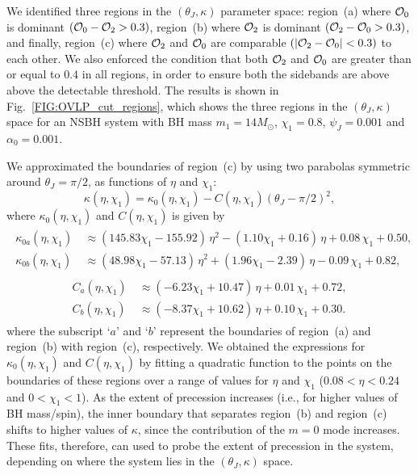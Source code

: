 We identified three regions in the $(\theta_J, \kappa)$ parameter space:
region~(a) where ${\cal{O}}_0$ is dominant $({\cal{O}}_0 - {\cal{O}}_2 >
0.3)$, region~(b) where ${\cal{O}}_2$ is dominant $({\cal{O}}_2 - {\cal{O}}_0
> 0.3)$, and finally, region~(c) where ${\cal O}_2$ and ${\cal O}_0$ are
comparable $(|{\cal{O}}_2-{\cal{O}}_0|< 0.3)$ to each other. We also enforced
the condition that both ${\cal O}_2$ and ${\cal O}_0$ are greater than or
equal to $0.4$ in all regions, in order to ensure both the sidebands are above
above the detectable threshold. The results is shown in
Fig.~\ref{FIG:OVLP_cut_regions}, which shows the three regions in the
$(\theta_J,\kappa)$ space for an NSBH system with BH mass $m_{1}=14 M_\odot$,
$\chi_1=0.8$, $\psi_J=0.001$ and $\alpha_0 =0.001$.


We approximated the boundaries of region~(c) by using two parabolas symmetric
around $\theta_J=\pi/2$, as functions of $\eta$ and $\chi_1$:
\begin{equation}
\kappa(\eta, \chi_1) = \kappa_{0}(\eta, \chi_1) - C(\eta, \chi_1)(\theta_J-\pi/2)^2, 
\label{EQ:boundary_region}
\end{equation}
where $\kappa_{0}(\eta, \chi_1)$ and $C(\eta, \chi_1)$ is given by
\begin{align}
\begin{split}
\kappa_{0a}(\eta, \chi_{1})~&\approx  (145.83 \chi_{1} - 155.92)\, \eta^2 -
(1.10 \chi_{1} + 0.16)\, \eta+ 0.08 \, \chi_{1}+0.50,\\
\kappa_{0b}(\eta, \chi_{1})~&\approx (48.98\chi_{1} - 57.13) \,\eta^2 +
(1.96{\chi_{1}}-2.39)\, \eta - 0.09 \, \chi_{1} +0.82,
\label{EQ:kappa_boundary}
\end{split}
\end{align}
\vspace{-10mm}
\begin{align}
\begin{split}
C_{a}(\eta, \chi_{1})~&\approx  (-6.23{\chi_{1}} + 10.47)\,
\eta +  0.01\, \chi_{1}+ 0.72,\\
C_{b}(\eta, \chi_{1})~&\approx  (-8.37{\chi_{1}} + 10.62)\, \eta +  0.10\,
\chi_{1}+ 0.30.
\label{EQ:phi_boundary}
\end{split}
\end{align}
where the subscript `$a$' and `$b$' represent the boundaries of region~(a) and
region~(b) with region~(c), respectively. We obtained the expressions for
$\kappa_{0}(\eta, \chi_1)$ and $C(\eta, \chi_1)$ by fitting a quadratic
function to the points on the boundaries of these regions over a range of
values for $\eta$ and $\chi_1$ ($0.08 < \eta < 0.24$ and $0 < \chi_1 < 1$).
As the extent of precession increases (i.e., for higher values of BH
mass/spin), the inner boundary that separates region~(b) and region~(c) shifts
to higher values of $\kappa$, since the contribution of the $m=0$ mode
increases. These fits, therefore, can used to probe the extent of precession
in the system, depending on where the system lies in the $(\theta_J,
\kappa)$ space.

